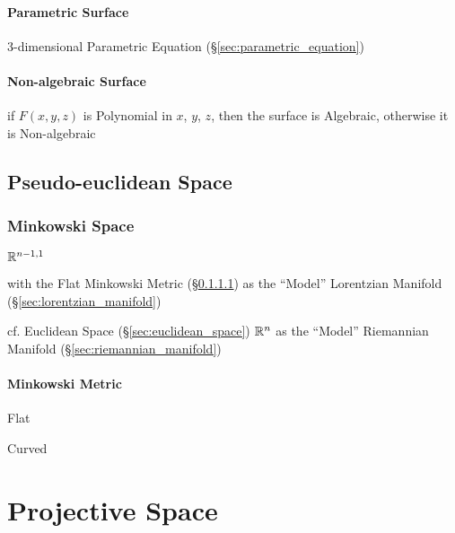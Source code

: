 \paragraph{Parametric Surface}\label{sec:parametric_surface}\hfill

3-dimensional Parametric Equation (\S\ref{sec:parametric_equation})



\paragraph{Non-algebraic Surface}\label{sec:nonalgebraic_surface}\hfill

if $F(x,y,z)$ is Polynomial in $x$, $y$, $z$, then the surface is
Algebraic, otherwise it is Non-algebraic



\subsection{Pseudo-euclidean Space}\label{sec:pseudo_euclidean}

\subsubsection{Minkowski Space}\label{sec:minkowski_space}

$\mathbb{R}^{n-1,1}$

with the Flat Minkowski Metric (\S\ref{sec:minkowski_metric}) as the
``Model'' Lorentzian Manifold (\S\ref{sec:lorentzian_manifold})

cf. Euclidean Space (\S\ref{sec:euclidean_space}) $\mathbb{R}^n$ as the
``Model'' Riemannian Manifold (\S\ref{sec:riemannian_manifold})



\paragraph{Minkowski Metric}\label{sec:minkowski_metric}\hfill

Flat

Curved



\section{Projective Space}\label{sec:projective_space}

